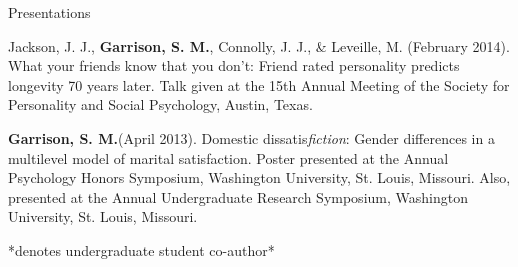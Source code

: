 \documentclass {resume}
\newcommand{\meb}{{\bf Garrison, S. M.}\xspace}
\newlength{\wideitemsep}
\let\olditem\item
\renewcommand{\item}{\setlength{\itemsep}{\wideitemsep}\olditem}
\begin{document}
\begin{rSection}{\textrm{Presentations}}
\begin{etaremune}
\item\begin{samepage}Jackson, J. J., \textbf{Garrison, S. M.}, Connolly, J. J., \& Leveille, M. (February 2014). What your friends know that you don't: Friend rated personality predicts longevity 70 years later. Talk given at the 15th Annual Meeting of the Society for Personality and  Social Psychology, Austin, Texas.\end{samepage}
\item\begin{samepage}\meb (April 2013). Domestic dissatis{\em fiction}: Gender differences in a multilevel model of marital satisfaction. Poster presented at the Annual Psychology Honors Symposium, Washington  University, St. Louis, Missouri. Also, presented at the Annual Undergraduate Research Symposium, Washington University, St. Louis, Missouri.\end{samepage}
\end{etaremune}\vspace{-3mm}\begin{center}\footnotesize{*denotes undergraduate student co-author*}\end{center} \vspace{-3mm}%
\end{rSection}
\pagestyle{myheadings}
\end{document}
